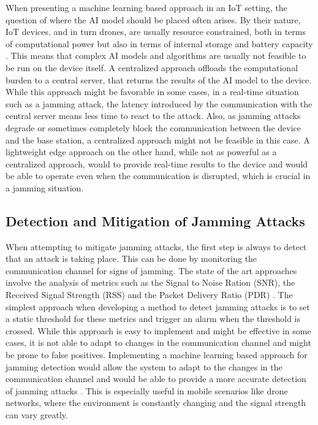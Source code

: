 \documentclass[futureinternet,article,submit,pdftex,moreauthors]{Definitions/mdpi}
\begin{document}
When presenting a machine learning based approach in an IoT setting, the question of where the AI model should be placed often arises. By their nature, IoT devices, and in turn drones, are usually resource constrained, 
both in terms of computational power but also in terms of internal storage and battery capacity \cite{6GSecurity-Chorti}. This means that complex AI models and algorithms are usually not feasible to be run on the device itself. A centralized approach 
offloads the computational burden to a central server, that returns the results of the AI model to the device. While this approach might be favorable in some cases, in a real-time situation such as a jamming attack, the latency introduced by the
communication with the central server means less time to react to the attack. Also, as jamming attacks degrade or sometimes completely block the communication between the device and the base station, a centralized approach might not be feasible in this case.
A lightweight edge approach on the other hand, while not as powerful as a centralized approach, would to provide real-time results to the device and would be able to operate even when the communication is disrupted, which is crucial in a jamming situation. 

\subsection{Detection and Mitigation of Jamming Attacks}\label{sec:DetectionMitigation}

When attempting to mitigate jamming attacks, the first step is always to detect that an attack is taking place. This can be done by monitoring the communication channel for signs of jamming. 
The state of the art approaches involve the analysis of metrics such as the Signal to Noise Ration (SNR), the Received Signal Strength (RSS) and the Packet Delivery Ratio (PDR) \cite{JammingDetection-Sciancalepore}. The simplest approach when 
developing a method to detect jamming attacks is to set a static threshold for these metrics and trigger an alarm when the threshold is crossed. While this approach is easy to implement and might be effective in some cases, it is not able to adapt to changes in the communication channel and might be prone to false positives.
Implementing a machine learning based approach for jamming detection would allow the system to adapt to the changes in the communication channel and would be able to provide a more accurate detection of jamming attacks \cite{VANETsAI-Lyamin}. This is especially useful in mobile scenarios like 
drone networks, where the environment is constantly changing and the signal strength can vary greatly. 
\end{document}
